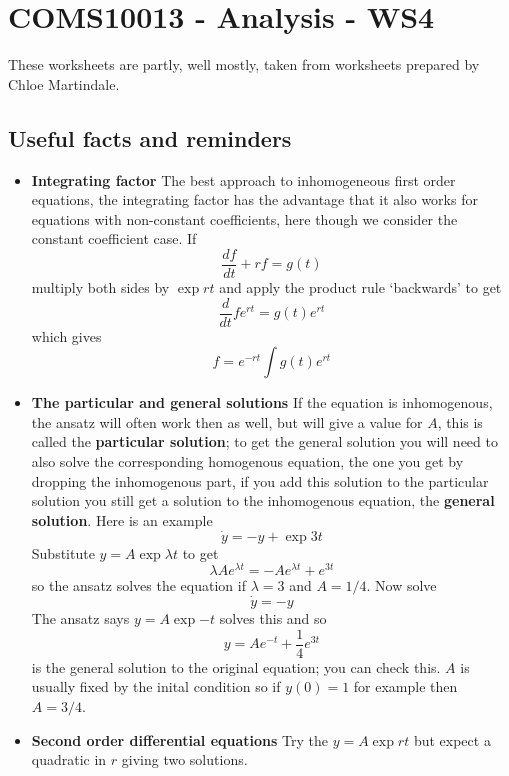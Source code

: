 \documentclass[11pt,a4paper]{scrartcl}
\begin{document}
\section*{COMS10013 - Analysis - WS4}

These worksheets are partly, well mostly, taken from worksheets prepared by Chloe Martindale.

\subsection*{Useful facts and reminders}

\begin{itemize}
\item \textbf{Integrating factor} The best approach to inhomogeneous first order equations, the integrating factor has the advantage that it also works for equations with non-constant coefficients, here though we consider the constant coefficient case. If
  \begin{equation}
    \frac{df}{dt}+rf=g(t)
  \end{equation}
  multiply both sides by $\exp{rt}$ and apply the product rule `backwards' to get
  \begin{equation}
    \frac{d}{dt}fe^{rt}=g(t)e^{rt}
  \end{equation}
  which gives
  \begin{equation}
    f=e^{-rt}\int g(t)e^{rt}
  \end{equation}


\item \textbf{The particular and general solutions} If the equation is inhomogenous, the ansatz will often work then as well, but will give a value for $A$, this is called the \textbf{particular solution}; to get the general solution you will need to also solve the corresponding homogenous equation, the one you get by dropping the inhomogenous part, if you add this solution to the particular solution you still get a solution to the inhomogenous equation, the \textbf{general solution}. Here is an example
  \begin{equation}
    \dot{y}=-y+\exp{3t}
  \end{equation}
  Substitute $y=A\exp{\lambda t}$ to get
  \begin{equation}
    \lambda Ae^{\lambda t}=-Ae^{\lambda t}+e^{3t}
  \end{equation}
  so the ansatz solves the equation if $\lambda=3$ and $A=1/4$. Now solve
  \begin{equation}
    \dot{y}=-y
  \end{equation}
  The ansatz says $y=A\exp{-t}$ solves this and so
  \begin{equation}
    y=Ae^{-t}+\frac{1}{4}e^{3t}
  \end{equation}
  is the general solution to the original equation; you can check this. $A$ is usually fixed by the inital condition so if $y(0)=1$ for example then $A=3/4$.

\item \textbf{Second order differential equations} Try the $y=A\exp{rt}$ but expect a quadratic in $r$ giving two solutions.
  
\end{itemize}
\end{document}
